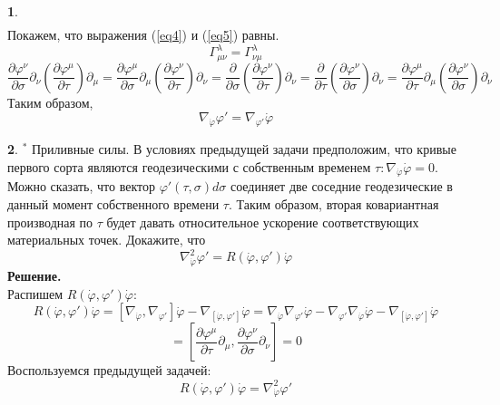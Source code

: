 \documentclass[12pt]{article}
\theoremstyle{definition}
\newtheorem{zad}{}[section]
\begin{document}
\begin{zad}
\begin{multline}
\end{multline}
Покажем, что выражения (\ref{eq4}) и (\ref{eq5}) равны.
\begin{equation}
    \Gamma^\lambda_{\mu\nu}=\Gamma^\lambda_{\nu\mu}
\end{equation}
\begin{equation*}
    \frac{\partial \varphi^\nu}{\partial\sigma}\partial_\nu\left(\frac{\partial\varphi^\mu}{\partial\tau}\right)\partial_\mu=\frac{\partial \varphi^\mu}{\partial\sigma}\partial_\mu\left(\frac{\partial\varphi^\nu}{\partial\tau}\right)\partial_\nu=\frac{\partial}{\partial\sigma}\left(\frac{\partial\varphi^\nu}{\partial\tau}\right)\partial_\nu=\frac{\partial}{\partial\tau}\left(\frac{\partial\varphi^\nu}{\partial\sigma}\right)\partial_\nu=\frac{\partial \varphi^\mu}{\partial\tau}\partial_\mu\left(\frac{\partial\varphi^\nu}{\partial\sigma}\right)\partial_\nu
\end{equation*}
Таким образом,
\begin{equation}
    \boxed{\nabla_{\dot{\varphi}}\varphi'=\nabla_{\varphi'}\dot{\varphi}}
\end{equation}
\end{zad}
\begin{zad}
\textbf{$^*$} Приливные силы. В условиях предыдущей задачи предположим, что кривые первого сорта являются геодезическими с собственным временем $\tau:\nabla_{\dot{\varphi}}\dot{\varphi} = 0$. Можно сказать, что вектор $\varphi'(\tau,\sigma)d\sigma$ соединяет две соседние геодезические в данный момент собственного времени $\tau$. Таким образом, вторая ковариантная производная по $\tau$ будет давать относительное ускорение соответствующих материальных точек. Докажите, что
\begin{equation}
    \nabla^2_{\dot{\varphi}}\varphi'=R(\dot{\varphi},\varphi')\dot\varphi
\end{equation}
\textbf{Решение.}\\
Распишем $R(\dot{\varphi},\varphi')\dot\varphi$:
\begin{equation}
    R(\dot{\varphi},\varphi')\dot\varphi=[\nabla_{\dot{\varphi}},\nabla_{\varphi'}]\dot{\varphi}-\nabla_{[\dot{\varphi},\varphi']}\dot{\varphi}=\nabla_{\dot{\varphi}}\nabla_{\varphi'}\dot{\varphi}-\nabla_{\varphi'}\nabla_{\dot{\varphi}}\dot{\varphi}-\nabla_{[\dot{\varphi},\varphi']}\dot{\varphi}
\end{equation}
\begin{equation}
    [\dot{\varphi},\varphi']=\left[\frac{\partial \varphi^\mu}{\partial\tau}\partial_\mu,\frac{\partial \varphi^\nu}{\partial\sigma}\partial_\nu\right]=0
\end{equation}
Воспользуемся предыдущей задачей:
\begin{equation}
     \boxed{R(\dot{\varphi},\varphi')\dot\varphi=\nabla^2_{\dot{\varphi}}\varphi'}
\end{equation}
\end{zad}
\end{document}
